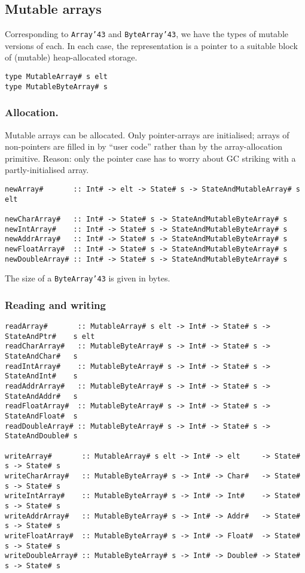 \subsection{Mutable arrays}
\label{sect:mutable}

Corresponding to \mbox{\tt Array{\char'43}} and \mbox{\tt ByteArray{\char'43}},
we have the types of mutable versions of each.  
In each case, the representation is a pointer
to a suitable block of (mutable) heap-allocated storage.
\begin{verbatim}
type MutableArray# s elt
type MutableByteArray# s
\end{verbatim}
\subsubsection{Allocation.}

Mutable arrays can be allocated.
Only pointer-arrays are initialised; arrays of non-pointers are filled
in by ``user code'' rather than by the array-allocation primitive.
Reason: only the pointer case has to worry about GC striking with a
partly-initialised array.
\begin{verbatim}
newArray#       :: Int# -> elt -> State# s -> StateAndMutableArray# s elt 

newCharArray#   :: Int# -> State# s -> StateAndMutableByteArray# s 
newIntArray#    :: Int# -> State# s -> StateAndMutableByteArray# s 
newAddrArray#   :: Int# -> State# s -> StateAndMutableByteArray# s 
newFloatArray#  :: Int# -> State# s -> StateAndMutableByteArray# s 
newDoubleArray# :: Int# -> State# s -> StateAndMutableByteArray# s 
\end{verbatim}
The size of a \mbox{\tt ByteArray{\char'43}} is given in bytes.

\subsubsection{Reading and writing}

\begin{verbatim}
readArray#       :: MutableArray# s elt -> Int# -> State# s -> StateAndPtr#    s elt
readCharArray#   :: MutableByteArray# s -> Int# -> State# s -> StateAndChar#   s
readIntArray#    :: MutableByteArray# s -> Int# -> State# s -> StateAndInt#    s
readAddrArray#   :: MutableByteArray# s -> Int# -> State# s -> StateAndAddr#   s 
readFloatArray#  :: MutableByteArray# s -> Int# -> State# s -> StateAndFloat#  s 
readDoubleArray# :: MutableByteArray# s -> Int# -> State# s -> StateAndDouble# s 

writeArray#       :: MutableArray# s elt -> Int# -> elt     -> State# s -> State# s 
writeCharArray#   :: MutableByteArray# s -> Int# -> Char#   -> State# s -> State# s 
writeIntArray#    :: MutableByteArray# s -> Int# -> Int#    -> State# s -> State# s 
writeAddrArray#   :: MutableByteArray# s -> Int# -> Addr#   -> State# s -> State# s 
writeFloatArray#  :: MutableByteArray# s -> Int# -> Float#  -> State# s -> State# s 
writeDoubleArray# :: MutableByteArray# s -> Int# -> Double# -> State# s -> State# s 
\end{verbatim}

